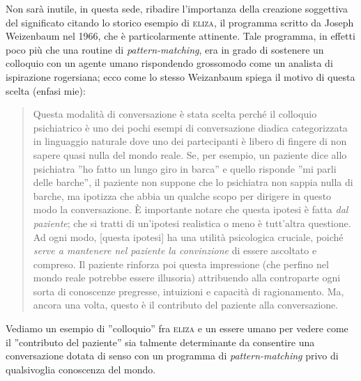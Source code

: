 Non sarà inutile, in questa sede, ribadire l'importanza della creazione soggettiva del significato citando lo storico esempio di \textsc{eliza}\cite{eliza},  il programma scritto da Joseph Weizenbaum nel 1966, che è particolarmente attinente. Tale programma, in effetti poco più che una routine di \emph{pattern-matching}, era in grado di sostenere un colloquio con un agente umano rispondendo grossomodo come un analista di ispirazione rogersiana; ecco come lo stesso Weizanbaum spiega il motivo di questa scelta\cite{eliza} (enfasi mie):

\begin{quote}
Questa modalità di conversazione è stata scelta perché il colloquio psichiatrico è uno dei pochi esempi di conversazione diadica categorizzata in linguaggio naturale dove uno dei partecipanti è libero di fingere di non sapere quasi nulla del mondo reale. Se, per esempio, un paziente dice allo psichiatra ''ho fatto un lungo giro in barca'' e quello risponde ''mi parli delle barche'', il paziente non suppone che lo psichiatra non sappia nulla di barche, ma ipotizza che abbia un qualche scopo per dirigere in questo modo la conversazione. \`{E} importante notare che questa ipotesi è fatta \emph{dal paziente}; che si tratti di un'ipotesi realistica o meno è tutt'altra questione. Ad ogni modo, [questa ipotesi] ha una utilità psicologica cruciale, poiché \emph{serve a mantenere nel paziente la convinzione} di essere ascoltato e compreso. Il paziente rinforza poi questa impressione (che perfino nel mondo reale potrebbe essere illusoria) attribuendo alla controparte ogni sorta di conoscenze pregresse, intuizioni e capacità di ragionamento. Ma, ancora una volta, questo è il contributo del paziente alla conversazione.
\end{quote}

\noindent Vediamo un esempio di ''colloquio'' fra \textsc{eliza} e un essere umano per vedere come il ''contributo del paziente'' sia talmente determinante da consentire una conversazione dotata di senso con un programma di \emph{pattern-matching} privo di qualsivoglia conoscenza del mondo\cite{eliza2}.

